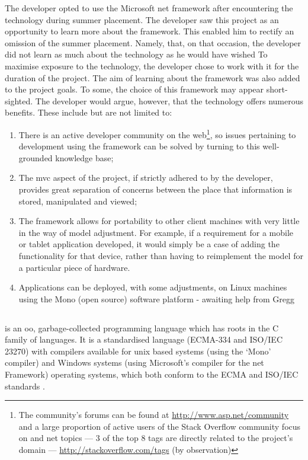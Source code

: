 The developer opted to use the Microsoft \gls{net} framework after encountering the technology during summer placement.   
The developer saw this project as an opportunity to learn more about the framework.  
This enabled him to rectify an omission of the summer placement.  Namely, that, on that occasion, the developer did not learn as much about the technology as he would have wished \cite{summerPlacementReport}
To maximise exposure to the technology, the developer chose to work with it for the duration of the project.  The aim of learning about the framework was also added to the project goals. To some, the choice of this framework may appear short-sighted.  The developer would argue, however, that the technology offers numerous benefits.  These include but are not limited to: 
\begin{enumerate}
	\item There is an active developer community on the web\footnote{The community's forums can be found at \url{http://www.asp.net/community} and a large proportion of active users of the Stack Overflow community focus on \cs{} and \gls{net} topics --- 3 of the top 8 tags are directly related to the project's domain --- \url{http://stackoverflow.com/tags} (by observation)}, so issues pertaining to development using the framework can be solved by turning to this well-grounded knowledge base;
	\item The \gls{mvc} aspect of the project, if strictly adhered to by the developer, provides great separation of concerns between the place that information is stored, manipulated and viewed;
	\item The framework allows for portability to other client machines with very little in the way of model adjustment. For example, if a requirement for a mobile or tablet application developed, it would simply be a case of adding the functionality for that device, rather than having to reimplement the model for a particular piece of hardware.
	\item Applications can be deployed, with some adjustments, on Linux machines using the Mono (open source) software platform \revisit - awaiting help from Gregg
\end{enumerate}

\subsection{\cs}
\label{csharpDiscussion}
\cs{} is an \gls{oo}, garbage-collected programming language which has roots in the C family of languages.  It is a standardised language (ECMA-334 and ISO/IEC 23270) with compilers available for unix based systems (using the `Mono' compiler) and Windows systems (using Microsoft's \cs{} compiler for the \gls{net} Framework) operating systems, which both conform to the ECMA and ISO/IEC standards \cite{monoStandardised} \cite{csPL}.


